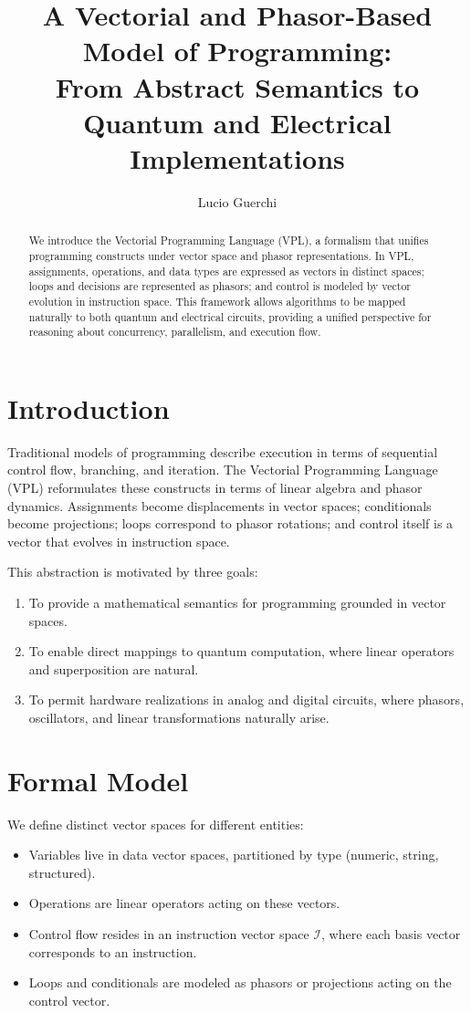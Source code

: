 \documentclass[12pt]{article}
\title{A Vectorial and Phasor-Based Model of Programming:\\
From Abstract Semantics to Quantum and Electrical Implementations}
\author{Lucio Guerchi}
\date{}
\begin{document}
\maketitle

\begin{abstract}
We introduce the Vectorial Programming Language (VPL), a formalism that unifies
programming constructs under vector space and phasor representations. In VPL,
assignments, operations, and data types are expressed as vectors in distinct
spaces; loops and decisions are represented as phasors; and control is modeled
by vector evolution in instruction space. This framework allows algorithms to be
mapped naturally to both quantum and electrical circuits, providing a unified
perspective for reasoning about concurrency, parallelism, and execution flow.
\end{abstract}

\section{Introduction}
Traditional models of programming describe execution in terms of sequential
control flow, branching, and iteration. The Vectorial Programming Language
(VPL) reformulates these constructs in terms of linear algebra and phasor
dynamics. Assignments become displacements in vector spaces; conditionals
become projections; loops correspond to phasor rotations; and control itself is
a vector that evolves in instruction space.

This abstraction is motivated by three goals:
\begin{enumerate}
  \item To provide a mathematical semantics for programming grounded in vector
        spaces.
  \item To enable direct mappings to quantum computation, where linear operators
        and superposition are natural.
  \item To permit hardware realizations in analog and digital circuits, where
        phasors, oscillators, and linear transformations naturally arise.
\end{enumerate}

\section{Formal Model}
We define distinct vector spaces for different entities:
\begin{itemize}
  \item Variables live in data vector spaces, partitioned by type (numeric,
        string, structured).
  \item Operations are linear operators acting on these vectors.
  \item Control flow resides in an instruction vector space $\mathcal{I}$, where
        each basis vector corresponds to an instruction.
  \item Loops and conditionals are modeled as phasors or projections acting on
        the control vector.
\end{itemize}
\end{document}
